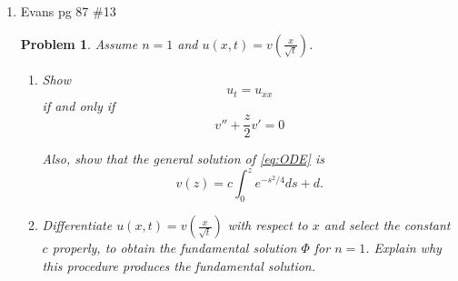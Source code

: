 \documentclass[a4paper]{article}
\newtheorem*{problem}{Problem}
\begin{document}
\begin{enumerate}
\begin{proof}
\begin{enumerate}
        \item
          By part (a), we know $u_\lambda(x,t) = u(\lambda x, \lambda^2 t)$ satisfies the heat equation.
          Write
          \[ u_\lambda(x, t) = u( \lambda x_1, \dots, \lambda x_n, \lambda^2 t) .\]
          Taking the derivative with respect to $\lambda$ gives
          \begin{align*}
            \partial_\lambda u_\lambda &= x_1 \partial_{x_1} u + \dots + \partial_{x_n} u + 2 \lambda t \partial_t u \\
            &= x \cdot Du + 2 \lambda t u_t
          \end{align*}
          By choosing $\lambda = 1$, we get $v$.
          By assumption, $u$ is smooth, so our partial derivatives commute. Therefore,
          \begin{align*}
            v_t - \Delta v &= \partial_t ( \partial_\lambda u_\lambda |_{\lambda=1} ) - \Delta ( \partial_\lambda u_\lambda |_{\lambda=1} ) \\
            &= \partial_\lambda (\partial_t u_\lambda ) |_{\lambda=1} + \partial_\lambda (\Delta u_\lambda) |_{\lambda=1} \\
            &= \partial_\lambda (\partial_t u_\lambda + \Delta u_\lambda ) |_{\lambda=1} \\
            &= 0
          \end{align*}
          because $u_\lambda$ solves the heat equation. Thus, $v$ solves the heat equation as well.
      \end{enumerate}
    \end{proof}

  \item Evans pg 87 \#13
    \begin{problem}
      Assume $n = 1$ and $u(x,t) = v\left( \frac{x}{\sqrt{t}} \right)$.
      \begin{enumerate}
        \item Show
          \[ u_t = u_{xx} \]
          if and only if
          \begin{equation} \label{eq:ODE}
            v'' + \frac{z}{2} v' = 0
          \end{equation}

          Also, show that the general solution of \eqref{eq:ODE} is
          \[ v(z) = c \int_{0}^{z} e^{-s^2/4} ds + d .\]

        \item
          Differentiate $u(x,t) = v\left( \frac{x}{\sqrt{t}} \right)$ with respect to $x$ and select the constant $c$ properly, to obtain the
          fundamental solution $\Phi$ for $n = 1$. Explain why this procedure produces the fundamental solution.


\end{enumerate}
\end{problem}
\end{enumerate}
\end{document}
